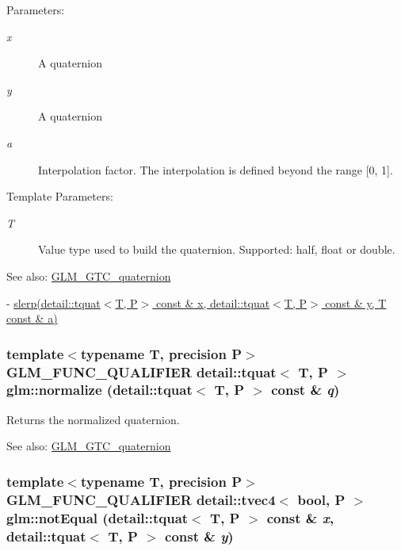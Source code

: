\begin{Desc}
\item[Parameters:]
\begin{description}
\item[{\em x}]A quaternion \item[{\em y}]A quaternion \item[{\em a}]Interpolation factor. The interpolation is defined beyond the range \mbox{[}0, 1\mbox{]}. \end{description}
\end{Desc}
\begin{Desc}
\item[Template Parameters:]
\begin{description}
\item[{\em T}]Value type used to build the quaternion. Supported: half, float or double. \end{description}
\end{Desc}
\begin{Desc}
\item[See also:]\hyperlink{group__gtc__quaternion}{GLM\_\-GTC\_\-quaternion} 

- \hyperlink{group__gtc__quaternion_ga75cee4315cd8e7f15eaac3ea944106a}{slerp(detail::tquat$<$T, P$>$ const \& x, detail::tquat$<$T, P$>$ const \& y, T const \& a)} \end{Desc}
\hypertarget{group__gtc__quaternion_g396b587a47d7e611895b2c95892a2e17}{
\subsubsection[normalize]{\setlength{\rightskip}{0pt plus 5cm}template$<$typename T, precision P$>$ GLM\_\-FUNC\_\-QUALIFIER detail::tquat$<$ T, P $>$ glm::normalize (detail::tquat$<$ T, P $>$ const \& {\em q})}}
\label{group__gtc__quaternion_g396b587a47d7e611895b2c95892a2e17}


Returns the normalized quaternion.

\begin{Desc}
\item[See also:]\hyperlink{group__gtc__quaternion}{GLM\_\-GTC\_\-quaternion} \end{Desc}
\hypertarget{group__gtc__quaternion_g5299d50f9c7692d388f1275cff4e89ce}{
\subsubsection[notEqual]{\setlength{\rightskip}{0pt plus 5cm}template$<$typename T, precision P$>$ GLM\_\-FUNC\_\-QUALIFIER detail::tvec4$<$ bool, P $>$ glm::notEqual (detail::tquat$<$ T, P $>$ const \& {\em x}, \/  detail::tquat$<$ T, P $>$ const \& {\em y})}}
\label{group__gtc__quaternion_g5299d50f9c7692d388f1275cff4e89ce}


